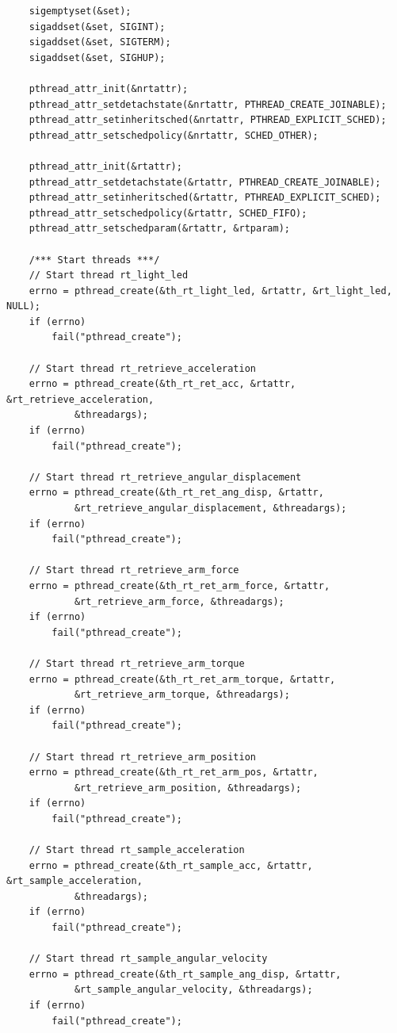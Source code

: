 \documentclass[12pt]{scrreprt}
\begin{document}
\begin{appendices}
\begin{verbatim}
    sigemptyset(&set);
    sigaddset(&set, SIGINT);
    sigaddset(&set, SIGTERM);
    sigaddset(&set, SIGHUP);

    pthread_attr_init(&nrtattr);
    pthread_attr_setdetachstate(&nrtattr, PTHREAD_CREATE_JOINABLE);
    pthread_attr_setinheritsched(&nrtattr, PTHREAD_EXPLICIT_SCHED);
    pthread_attr_setschedpolicy(&nrtattr, SCHED_OTHER);

    pthread_attr_init(&rtattr);
    pthread_attr_setdetachstate(&rtattr, PTHREAD_CREATE_JOINABLE);
    pthread_attr_setinheritsched(&rtattr, PTHREAD_EXPLICIT_SCHED);
    pthread_attr_setschedpolicy(&rtattr, SCHED_FIFO);
    pthread_attr_setschedparam(&rtattr, &rtparam);

    /*** Start threads ***/
    // Start thread rt_light_led
    errno = pthread_create(&th_rt_light_led, &rtattr, &rt_light_led, NULL);
    if (errno)
        fail("pthread_create");

    // Start thread rt_retrieve_acceleration
    errno = pthread_create(&th_rt_ret_acc, &rtattr, &rt_retrieve_acceleration,
            &threadargs);
    if (errno)
        fail("pthread_create");

    // Start thread rt_retrieve_angular_displacement
    errno = pthread_create(&th_rt_ret_ang_disp, &rtattr,
            &rt_retrieve_angular_displacement, &threadargs);
    if (errno)
        fail("pthread_create");

    // Start thread rt_retrieve_arm_force
    errno = pthread_create(&th_rt_ret_arm_force, &rtattr,
            &rt_retrieve_arm_force, &threadargs);
    if (errno)
        fail("pthread_create");

    // Start thread rt_retrieve_arm_torque
    errno = pthread_create(&th_rt_ret_arm_torque, &rtattr,
            &rt_retrieve_arm_torque, &threadargs);
    if (errno)
        fail("pthread_create");

    // Start thread rt_retrieve_arm_position
    errno = pthread_create(&th_rt_ret_arm_pos, &rtattr,
            &rt_retrieve_arm_position, &threadargs);
    if (errno)
        fail("pthread_create");

    // Start thread rt_sample_acceleration
    errno = pthread_create(&th_rt_sample_acc, &rtattr, &rt_sample_acceleration,
            &threadargs);
    if (errno)
        fail("pthread_create");

    // Start thread rt_sample_angular_velocity
    errno = pthread_create(&th_rt_sample_ang_disp, &rtattr,
            &rt_sample_angular_velocity, &threadargs);
    if (errno)
        fail("pthread_create");


\end{verbatim}
\end{appendices}
\end{document}
